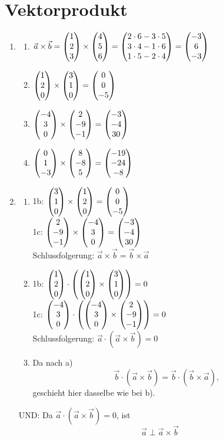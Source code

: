 \section{Vektorprodukt}
	\begin{enumerate}
\item
	\begin{enumerate}
		\item $\vec{a} \times \vec{b} = \vektor{1}{2}{3}\times\vektor{4}{5}{6}=\vektor{2 \cdot 6 - 3 \cdot 5}{3 \cdot 4 - 1 \cdot 6}{1 \cdot 5 - 2 \cdot 4} =\vektor{-3}{6}{-3}$
		\item $\vektor{1}{2}{0}\times\vektor{3}{1}{0}=\vektor{0}{0}{-5}$
		\item $\vektor{-4}{3}{0}\times\vektor{2}{-9}{-1}=\vektor{-3}{-4}{30}$
		\item $\vektor{0}{1}{-3}\times\vektor{8}{-8}{5}= \vektor{-19}{-24}{-8}$
	\end{enumerate}

\item
	\begin{enumerate}
		\item 1b:	$\vektor{3}{1}{0}\times\vektor{1}{2}{0}=\vektor{0}{0}{-5}$\\
			  1c:	$\vektor{2}{-9}{-1}\times\vektor{-4}{3}{0}=\vektor{-3}{-4}{30}$\\
			  Schlussfolgerung: $\vec{a}\times\vec{b}=\vec{b}\times\vec{a}$\bigskip
		\item 1b:	$\vektor{1}{2}{0}\cdot\left(\vektor{1}{2}{0}\times\vektor{3}{1}{0}\right)=0$\\
			  1c:	$\vektor{-4}{3}{0}\cdot\left(\vektor{-4}{3}{0}\times\vektor{2}{-9}{-1}\right)=0$\\
			  Schlussfolgerung: $\vec{a}\cdot(\vec{a}\times\vec{b})=0$\bigskip
		\item Da nach a) $$\vec{b}\cdot(\vec{a}\times\vec{b})=\vec{b}\cdot(\vec{b}\times\vec{a}),$$ geschieht hier dasselbe wie bei b).\\		
	\end{enumerate}
	UND: Da $\vec{a}\cdot(\vec{a}\times\vec{b})=0$, ist $$\vec{a}\perp\vec{a}\times\vec{b}$$
	
\end{enumerate}
